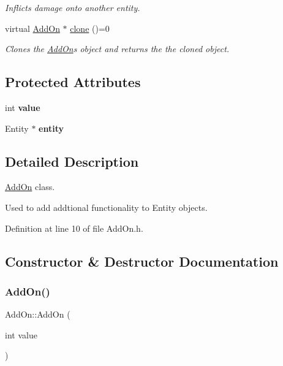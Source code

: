 \begin{DoxyCompactItemize}
\begin{DoxyCompactList}\small\item\em Inflicts damage onto another entity. \end{DoxyCompactList}\item 
virtual \hyperlink{classAddOn}{Add\+On} $\ast$ \hyperlink{classAddOn_a5a090bf8b4e7260aa35d6f5b9d151955}{clone} ()=0
\begin{DoxyCompactList}\small\item\em Clones the \hyperlink{classAddOn}{Add\+On}\textquotesingle{}s object and returns the the cloned object. \end{DoxyCompactList}\end{DoxyCompactItemize}
\subsection*{Protected Attributes}
\begin{DoxyCompactItemize}
\item 
\mbox{\label{classAddOn_a5c051eef3f3e8200d5a48cfc50174f91}} 
int {\bfseries value}
\item 
\mbox{\label{classAddOn_aaa321002131799f305663626784e364e}} 
Entity $\ast$ {\bfseries entity}
\end{DoxyCompactItemize}


\subsection{Detailed Description}
\hyperlink{classAddOn}{Add\+On} class. 

Used to add addtional functionality to Entity objects. 

Definition at line 10 of file Add\+On.\+h.



\subsection{Constructor \& Destructor Documentation}
\mbox{\label{classAddOn_a64f23691b6c7fc49b6584f8f761ce4d9}} 
\subsubsection{\texorpdfstring{Add\+On()}{AddOn()}}
{\footnotesize\ttfamily Add\+On\+::\+Add\+On (\begin{DoxyParamCaption}\item[{int}]{value }\end{DoxyParamCaption})}



